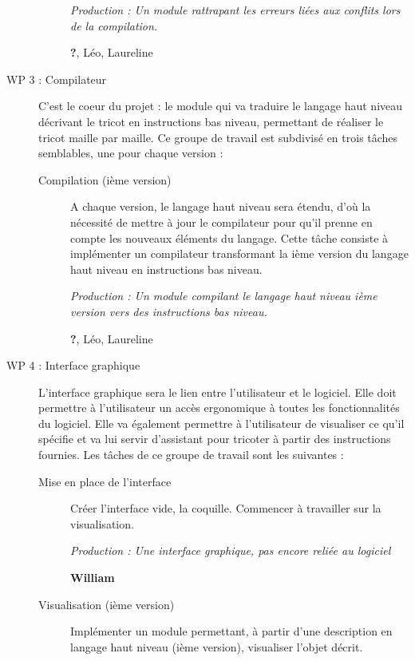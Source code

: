 \documentclass{article}
\begin{document}
\begin{description}
\begin{description}
      \textit{Production : Un module rattrapant les erreurs liées aux conflits lors de la compilation.}

      \textbf{?}, Léo, Laureline

    \end{description}

\medskip

\item[WP 3 : Compilateur] C'est le coeur du projet : le module qui va traduire le langage haut niveau décrivant le tricot en instructions 
bas niveau, permettant de réaliser le tricot maille par maille. Ce groupe de travail est subdivisé en trois tâches semblables, une pour 
chaque version :

    \begin{description}
    \item[Compilation (ième version)] A chaque version, le langage haut niveau sera étendu, d'où la nécessité de mettre à jour le 
compilateur pour qu'il prenne en compte les nouveaux éléments du langage. Cette tâche consiste à implémenter un compilateur transformant 
la ième version du langage haut niveau en instructions bas niveau.

      \textit{Production : Un module compilant le langage haut niveau ième version vers des instructions bas niveau.}

      \textbf{?}, Léo, Laureline %
    \end{description}

\medskip

\item[WP 4 : Interface graphique] L'interface graphique sera le lien entre l'utilisateur et le logiciel. Elle doit permettre à 
l'utilisateur un accès ergonomique à toutes les fonctionnalités du logiciel. Elle va également permettre à l'utilisateur de visualiser ce 
qu'il spécifie et va lui servir d'assistant pour tricoter à partir des instructions fournies. Les tâches de ce groupe de travail sont les 
suivantes :

  \begin{description}
  \item[Mise en place de l'interface] Créer l'interface vide, la coquille. Commencer à travailler sur la visualisation.

    \textit{Production : Une interface graphique, pas encore reliée au logiciel}

    \textbf{William}
	
  \item[Visualisation (ième version)] Implémenter un module permettant, à partir d'une description en langage haut niveau (ième version), 
visualiser l'objet décrit.


\end{description}
\end{description}
\end{document}
